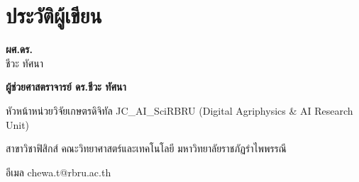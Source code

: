 \chapter*{ประวัติผู้เขียน}

\noindent
\begin{minipage}[c]{0.28\textwidth}
    \centering
    \begin{tcolorbox}[
        enhanced,
        width=3.6cm,
        height=3.6cm,
        colback=rbruNavy!10,
        colframe=rbruGold,
        boxrule=2pt,
        arc=1.8cm,
        halign=center,
        valign=center,
        drop shadow=black!10
    ]
        \centering
        {\fontsize{24}{28}\selectfont\color{rbruNavy} \textbf{ผศ.ดร.}}\\[2pt]
        {\fontsize{13}{16}\selectfont\color{rbruSlate} ชีวะ ทัศนา}
    \end{tcolorbox}
\end{minipage}%
\hfill
\begin{minipage}[c]{0.68\textwidth}
    {\fontsize{18}{22}\selectfont\bfseries\color{rbruNavy} ผู้ช่วยศาสตราจารย์ ดร.ชีวะ ทัศนา\par}
    \vspace{0.2cm}
    {\fontsize{14}{18}\selectfont\color{rbruSlate} หัวหน้าหน่วยวิจัยเกษตรดิจิทัล JC\_AI\_SciRBRU (Digital Agriphysics \& AI Research Unit)\par}
    {\fontsize{14}{18}\selectfont\color{rbruSlate} สาขาวิชาฟิสิกส์ คณะวิทยาศาสตร์และเทคโนโลยี มหาวิทยาลัยราชภัฏรำไพพรรณี\par}
    \vspace{0.2cm}
    {\fontsize{13}{16}\selectfont\color{rbruTeal} อีเมล chewa.t@rbru.ac.th\par}
\end{minipage}

\vspace{0.4cm}
\noindent{\color{rbruGold}\rule{\textwidth}{1.5pt}}\par
\vspace{0.4cm}

